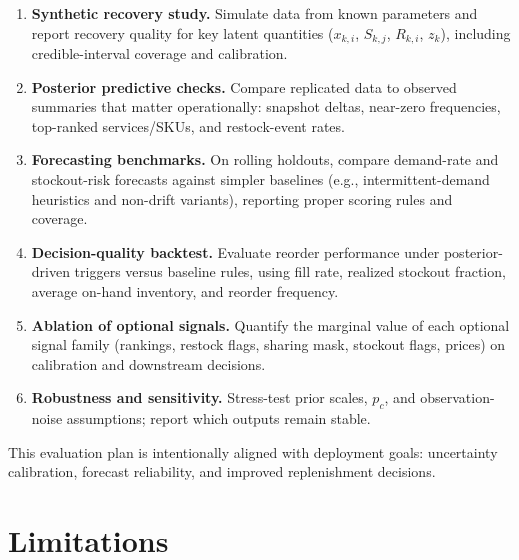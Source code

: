 \documentclass[11pt]{article}
\begin{document}
\begin{enumerate}
  \item \textbf{Synthetic recovery study.} Simulate data from known parameters and report recovery quality for key latent quantities ($x_{k,i}$, $S_{k,j}$, $R_{k,i}$, $z_k$), including credible-interval coverage and calibration.

  \item \textbf{Posterior predictive checks.} Compare replicated data to observed summaries that matter operationally: snapshot deltas, near-zero frequencies, top-ranked services/SKUs, and restock-event rates.

  \item \textbf{Forecasting benchmarks.} On rolling holdouts, compare demand-rate and stockout-risk forecasts against simpler baselines (e.g., intermittent-demand heuristics and non-drift variants), reporting proper scoring rules and coverage.

  \item \textbf{Decision-quality backtest.} Evaluate reorder performance under posterior-driven triggers versus baseline rules, using fill rate, realized stockout fraction, average on-hand inventory, and reorder frequency.

  \item \textbf{Ablation of optional signals.} Quantify the marginal value of each optional signal family (rankings, restock flags, sharing mask, stockout flags, prices) on calibration and downstream decisions.

  \item \textbf{Robustness and sensitivity.} Stress-test prior scales, $p_c$, and observation-noise assumptions; report which outputs remain stable.
\end{enumerate}

This evaluation plan is intentionally aligned with deployment goals: uncertainty calibration, forecast reliability, and improved replenishment decisions.

\section{Limitations}
\end{document}
